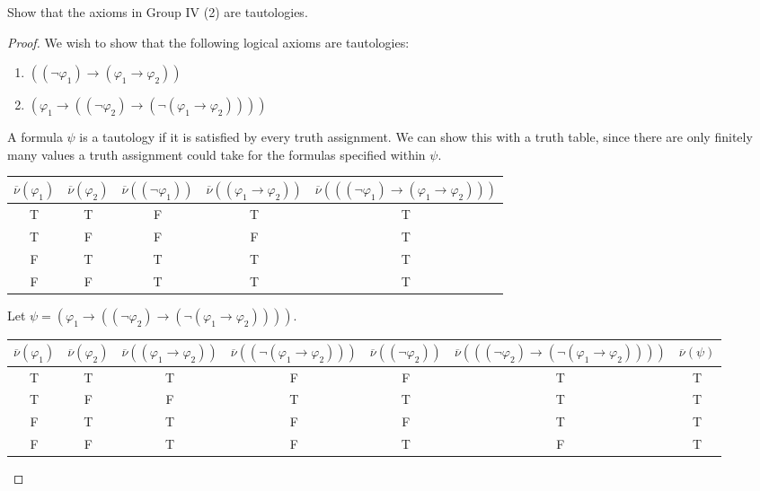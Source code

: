 \documentclass[12pt]{article}
\newenvironment{exercise}[2][Exercise]{\begin{trivlist}
\item[\hskip \labelsep {\bfseries #1}\hskip \labelsep {\bfseries #2.}]}{\end{trivlist}}
\begin{document}
\begin{exercise}{3}

Show that the axioms in Group IV (2) are tautologies.

\end{exercise}
 
\begin{proof}
We wish to show that the following logical axioms are tautologies:

\begin{enumerate}[label = \arabic*)]
\item $((\neg \varphi_1) \to (\varphi_1 \to \varphi_2))$
\item $(\varphi_1 \to ((\neg \varphi_2) \to (\neg (\varphi_1 \to \varphi_2))))$
\end{enumerate}

A formula $\psi$ is a tautology if it is satisfied by every truth assignment.  We can show this with a truth table, since there are only finitely many values a truth assignment could take for the formulas specified within $\psi$.

\begin{table}[h!]
\centering
\begin{tabular}{| c | c | c | c | c |}
\hline
$\overline{\nu}(\varphi_1)$ & $\overline{\nu}(\varphi_2)$ & $\overline{\nu}((\neg \varphi_1))$ & $\overline{\nu}((\varphi_1 \to \varphi_2))$ & $\overline{\nu}(((\neg \varphi_1) \to (\varphi_1 \to \varphi_2)))$ \\ [0.5ex]
\hline
T & T & F & T & T \\
T & F & F & F & T \\
F & T & T & T & T \\
F & F & T & T & T \\ [1ex]
\hline
\end{tabular}
\label{table:nonlin}
\end{table}

Let $\psi = (\varphi_1 \to ((\neg \varphi_2) \to (\neg (\varphi_1 \to \varphi_2))))$.

\begin{table}[h!]
\centering
\begin{tabular}{| c | c | c | c | c | c | c |}
\hline
$\overline{\nu}(\varphi_1)$ & $\overline{\nu}(\varphi_2)$ & $\overline{\nu}((\varphi_1 \to \varphi_2))$ & $\overline{\nu}((\neg (\varphi_1 \to \varphi_2)))$ & $\overline{\nu}((\neg \varphi_2))$ & $\overline{\nu}(((\neg \varphi_2) \to (\neg (\varphi_1 \to \varphi_2))))$ & $\overline{\nu}(\psi)$  \\ [0.5ex]
\hline
T & T & T & F & F & T & T \\
T & F & F & T & T & T & T \\
F & T & T & F & F & T & T \\
F & F & T & F & T & F & T \\ [1ex]
\hline
\end{tabular}
\label{table:nonlin}
\end{table}

\end{proof}
\end{document}

